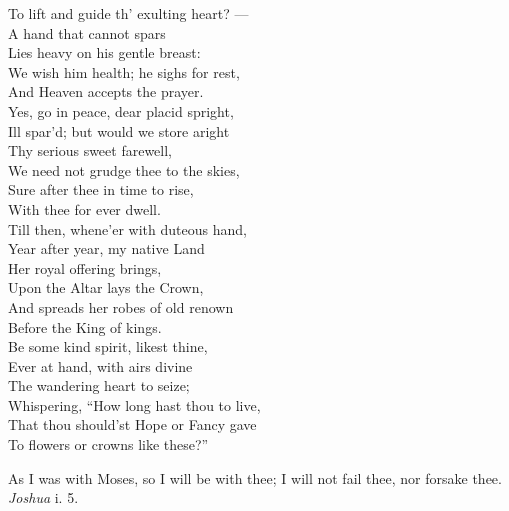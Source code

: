  To lift and guide th’ exulting heart? — \\
 A hand that cannot spars \\
 Lies heavy on his gentle breast: \\
 We wish him health; he sighs for rest, \\
 And Heaven accepts the prayer. \\
  Yes, go in peace, dear placid spright, \\
 Ill spar’d; but would we store aright \\
 Thy serious sweet farewell, \\
 We need not grudge thee to the skies, \\
 Sure after thee in time to rise, \\
 With thee for ever dwell. \\
  Till then, whene’er with duteous hand, \\
 Year after year, my native Land \\
 Her royal offering brings, \\
 Upon the Altar lays the Crown, \\
 And spreads her robes of old renown \\
 Before the King of kings. \\
  Be some kind spirit, likest thine, \\
 Ever at hand, with airs divine \\
 The wandering heart to seize; \\
 Whispering, “How long hast thou to live, \\
 That thou should’st Hope or Fancy gave \\
 To flowers or crowns like these?”\\


As I was with Moses, so I will be with thee; I will not fail thee, nor forsake thee. \emph{Joshua} i. 5.

